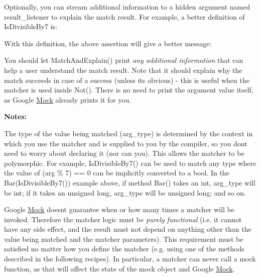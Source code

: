 Optionally, you can stream additional information to a hidden argument named {\ttfamily result\+\_\+listener} to explain the match result. For example, a better definition of {\ttfamily Is\+Divisible\+By7} is\+: 
\begin{DoxyCode}{0}
\DoxyCodeLine{}
\DoxyCodeLine{\}}
\end{DoxyCode}


With this definition, the above assertion will give a better message\+: 
\begin{DoxyCode}{0}
\end{DoxyCode}


You should let {\ttfamily Match\+And\+Explain()} print {\itshape any additional information} that can help a user understand the match result. Note that it should explain why the match succeeds in case of a success (unless it\textquotesingle{}s obvious) -\/ this is useful when the matcher is used inside {\ttfamily Not()}. There is no need to print the argument value itself, as Google \mbox{\hyperlink{class_mock}{Mock}} already prints it for you.

{\bfseries{Notes\+:}}


\begin{DoxyEnumerate}
\item The type of the value being matched ({\ttfamily arg\+\_\+type}) is determined by the context in which you use the matcher and is supplied to you by the compiler, so you don\textquotesingle{}t need to worry about declaring it (nor can you). This allows the matcher to be polymorphic. For example, {\ttfamily Is\+Divisible\+By7()} can be used to match any type where the value of {\ttfamily (arg \% 7) == 0} can be implicitly converted to a {\ttfamily bool}. In the {\ttfamily Bar(\+Is\+Divisible\+By7())} example above, if method {\ttfamily Bar()} takes an {\ttfamily int}, {\ttfamily arg\+\_\+type} will be {\ttfamily int}; if it takes an {\ttfamily unsigned long}, {\ttfamily arg\+\_\+type} will be {\ttfamily unsigned long}; and so on.
\end{DoxyEnumerate}
\begin{DoxyEnumerate}
\item Google \mbox{\hyperlink{class_mock}{Mock}} doesn\textquotesingle{}t guarantee when or how many times a matcher will be invoked. Therefore the matcher logic must be {\itshape purely functional} (i.\+e. it cannot have any side effect, and the result must not depend on anything other than the value being matched and the matcher parameters). This requirement must be satisfied no matter how you define the matcher (e.\+g. using one of the methods described in the following recipes). In particular, a matcher can never call a mock function, as that will affect the state of the mock object and Google \mbox{\hyperlink{class_mock}{Mock}}.
\end{DoxyEnumerate}

